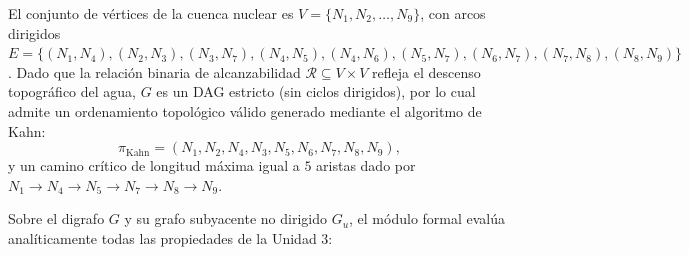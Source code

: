 \documentclass[12pt,letterpaper]{article}
\begin{document}
El conjunto de vértices de la cuenca nuclear es $V = \{N_1, N_2, \dots, N_9\}$, con arcos dirigidos $E = \{(N_1,N_4), (N_2,N_3), (N_3,N_7), (N_4,N_5), (N_4,N_6), (N_5,N_7), (N_6,N_7), (N_7,N_8), (N_8,N_9)\}$. Dado que la relación binaria de alcanzabilidad $\mathcal{R} \subseteq V \times V$ refleja el descenso topográfico del agua, $G$ es un DAG estricto (sin ciclos dirigidos), por lo cual admite un ordenamiento topológico válido generado mediante el algoritmo de Kahn:
\begin{equation}
    \pi_{\text{Kahn}} = (N_1, N_2, N_4, N_3, N_5, N_6, N_7, N_8, N_9),
\end{equation}
y un camino crítico de longitud máxima igual a $5$ aristas dado por $N_1 \to N_4 \to N_5 \to N_7 \to N_8 \to N_9$.

Sobre el digrafo $G$ y su grafo subyacente no dirigido $G_u$, el módulo formal evalúa analíticamente todas las propiedades de la Unidad 3:
\end{document}
